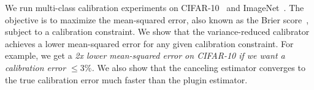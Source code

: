 We run multi-class calibration experiments on CIFAR-10~\cite{krizhevsky2009learningmultiple} and ImageNet~\cite{deng2009imagenet}.
The objective is to maximize the mean-squared error, also known as the Brier score~\cite{brier1950verification}, subject to a calibration constraint.
We show that the variance-reduced calibrator achieves a lower mean-squared error for any given calibration constraint.
For example, we get a \emph{2x lower mean-squared error on CIFAR-10 if we want a calibration error $\leq 3\%$.}
We also show that the canceling estimator converges to the true calibration error much faster than the plugin estimator.

